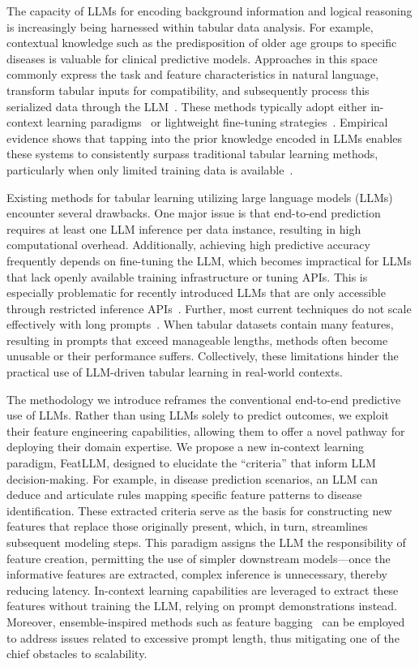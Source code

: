 The capacity of LLMs for encoding background information and logical reasoning is increasingly being harnessed within tabular data analysis. For example, contextual knowledge such as the predisposition of older age groups to specific diseases is valuable for clinical predictive models. Approaches in this space commonly express the task and feature characteristics in natural language, transform tabular inputs for compatibility, and subsequently process this serialized data through the LLM~\cite{dinh2022lift,wang2023anypredict}. These methods typically adopt either in-context learning paradigms~\cite{nam2023semi} or lightweight fine-tuning strategies~\cite{dinh2022lift,hegselmann2023tabllm}. Empirical evidence shows that tapping into the prior knowledge encoded in LLMs enables these systems to consistently surpass traditional tabular learning methods, particularly when only limited training data is available~\cite{hegselmann2023tabllm}.

Existing methods for tabular learning utilizing large language models (LLMs) encounter several drawbacks. One major issue is that end-to-end prediction requires at least one LLM inference per data instance, resulting in high computational overhead. Additionally, achieving high predictive accuracy frequently depends on fine-tuning the LLM, which becomes impractical for LLMs that lack openly available training infrastructure or tuning APIs. This is especially problematic for recently introduced LLMs that are only accessible through restricted inference APIs~\cite{anil2023palm,openai2023gpt4}. Further, most current techniques do not scale effectively with long prompts~\cite{liu2023lost}. When tabular datasets contain many features, resulting in prompts that exceed manageable lengths, methods often become unusable or their performance suffers. Collectively, these limitations hinder the practical use of LLM-driven tabular learning in real-world contexts.

The methodology we introduce reframes the conventional end-to-end predictive use of LLMs. Rather than using LLMs solely to predict outcomes, we exploit their feature engineering capabilities, allowing them to offer a novel pathway for deploying their domain expertise. We propose a new in-context learning paradigm, \textsf{FeatLLM}, designed to elucidate the ``criteria'' that inform LLM decision-making. For example, in disease prediction scenarios, an LLM can deduce and articulate rules mapping specific feature patterns to disease identification. These extracted criteria serve as the basis for constructing new features that replace those originally present, which, in turn, streamlines subsequent modeling steps. This paradigm assigns the LLM the responsibility of feature creation, permitting the use of simpler downstream models—once the informative features are extracted, complex inference is unnecessary, thereby reducing latency. In-context learning capabilities are leveraged to extract these features without training the LLM, relying on prompt demonstrations instead. Moreover, ensemble-inspired methods such as feature bagging~\cite{breiman2001random} can be employed to address issues related to excessive prompt length, thus mitigating one of the chief obstacles to scalability.

